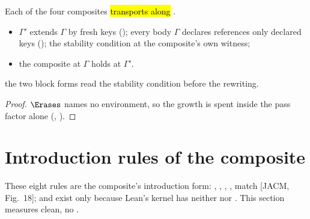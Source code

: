 \begin{lemma}
\label{lem:ErasesLB-specGrow}
\leanok
{}
 Each of the four composites \hl{transports along }.
\begin{itemize}
\item {} $\Gamma'$ extends $\Gamma$ by fresh keys (); every body $\Gamma$ declares
references only declared keys (); the stability condition at the composite's own
witness;
\item {} the composite at $\Gamma$ holds at $\Gamma'$.
\end{itemize}
 the two block forms read the stability condition before the  rewriting.
\end{lemma}
\begin{proof}
\leanok
{}
 $\Erases$ names no environment, so the growth is spent inside the pass factor alone
(, ).
\end{proof}

\section{Introduction rules of the composite}
\label{sec:refinement:intro}

These eight rules are the composite's introduction form: , , , ,
 match [JACM, Fig.~18];  and  exist only because Lean's kernel has neither
 nor . This section measures \stChecked{} clean, no .

